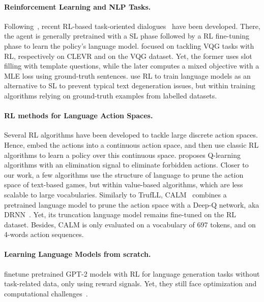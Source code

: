 \documentclass{article}
\newcommand{\algo}{TrufLL\xspace}
\begin{document}
\paragraph{Reinforcement Learning and NLP Tasks.}
Following~\citep{singh2002optimizing,lemon2007machine}, recent RL-based task-oriented dialogues~\citep{de2017guesswhat,das2017visual,lewis2017deal, narasimhan2015language} 
have been developed. 
There, the agent is generally pretrained with a SL phase followed by a RL fine-tuning phase to learn the policy's language model. \citet{yang2018visual,fan2018reinforcement} focused on tackling VQG tasks with RL, respectively on CLEVR and on the VQG dataset. 
Yet, the former uses slot filling with template questions, while the later computes a mixed objective with a MLE loss using ground-truth sentences. 
\citet{bahdanau2016actor,rennie2017self} use RL to train language models as an alternative to SL to prevent typical text degeneration issues, but within training algorithms relying on ground-truth examples from labelled datasets. 
\paragraph{RL methods for Language Action Spaces.}  

Several RL algorithms have been developed to tackle  large discrete action spaces. Hence, \citet{dulac2015deep, tennenholtz2019natural, chandak2019learning} embed the actions into a continuous action space, and then use classic RL algorithms to learn a policy over this continuous space. 
\citet{zahavy2018learn,seurin2020im} proposes Q-learning algorithms with an elimination signal to eliminate forbidden actions. 
Closer to our work, a few algorithms \citep{ammanabrolu2018playing} use the structure of language to prune the action space of text-based games,
but within value-based algorithms, which are less scalable to large vocabularies. 
Similarly to \algo, CALM~\citep{yao2020keep} combines a pretrained language model to prune the action space with a Deep-Q network, aka DRNN~\citep{he2016deep}.
Yet, its truncation language model remains fine-tuned on the RL dataset. Besides, CALM is only evaluated on a vocabulary of 697 tokens, and on 4-words action sequences. 

\paragraph{Learning Language Models from scratch.}  
\cite{ziegler2019fine, garg2021unsupervised} finetune pretrained GPT-2 models with RL for language generation tasks without task-related data, only using reward signals.
Yet, they still face optimization and computational challenges~\citep{parisotto2020stabilizing}. 
\end{document}
